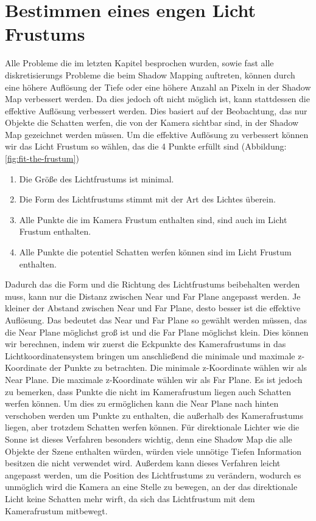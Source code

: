 \section{Bestimmen eines engen Licht Frustums}
\label{section:fit-the-frustum}
Alle Probleme die im letzten Kapitel besprochen wurden, sowie fast alle
diskretisierungs Probleme die beim Shadow Mapping auftreten, können
durch eine höhere Auflösung der Tiefe oder eine höhere Anzahl an Pixeln in der Shadow Map verbessert werden.
Da dies jedoch oft nicht möglich ist, kann stattdessen die effektive Auflösung verbessert werden.
Dies basiert auf der Beobachtung, das nur Objekte die Schatten werfen,
die von der Kamera sichtbar sind, in der Shadow Map gezeichnet werden müssen.
Um die effektive Auflösung zu verbessert können wir das Licht Frustum 
so wählen, das die 4 Punkte erfüllt sind (Abbildung: \ref{fig:fit-the-frustum})
\begin{enumerate}
  \item Die Größe des Lichtfrustums ist minimal.
  \item Die Form des Lichtfrustums stimmt mit der Art des Lichtes überein.
  \item Alle Punkte die im Kamera Frustum enthalten sind, sind auch im Licht Frustum enthalten.
  \item Alle Punkte die potentiel Schatten werfen können sind im Licht Frustum enthalten.
\end{enumerate}
Dadurch das die Form und die Richtung des Lichtfrustums beibehalten werden muss,
kann nur die Distanz zwischen Near und Far Plane angepasst werden.
Je kleiner der Abstand zwischen Near und Far Plane, desto besser 
ist die effektive Auflösung.
Das bedeutet das Near und Far Plane so gewählt werden müssen, das die Near Plane
möglichst groß ist und die Far Plane möglichst klein.
Dies können wir berechnen, indem wir zuerst die Eckpunkte des Kamerafrustums 
in das Lichtkoordinatensystem bringen um anschließend 
die minimale und maximale z-Koordinate der Punkte zu betrachten.
Die minimale z-Koordinate wählen wir als Near Plane.
Die maximale z-Koordinate wählen wir als Far Plane.
Es ist jedoch zu bemerken, dass Punkte die nicht im Kamerafrustum liegen
auch Schatten werfen können. 
Um dies zu ermöglichen kann die Near Plane nach hinten verschoben werden
um Punkte zu enthalten, die außerhalb des Kamerafrustums liegen, aber trotzdem Schatten werfen können.
\newline \newline
Für direktionale Lichter wie die Sonne ist dieses Verfahren besonders wichtig,
denn eine Shadow Map die alle Objekte der Szene enthalten würden,
würden viele unnötige Tiefen Information besitzen die nicht verwendet wird.
Außerdem kann dieses Verfahren leicht angepasst werden, um die Position des Lichtfrustums 
zu verändern, wodurch es unmöglich wird die Kamera an eine Stelle zu bewegen, an der das 
direktionale Licht keine Schatten mehr wirft, da sich das Lichtfrustum mit dem Kamerafrustum mitbewegt.

